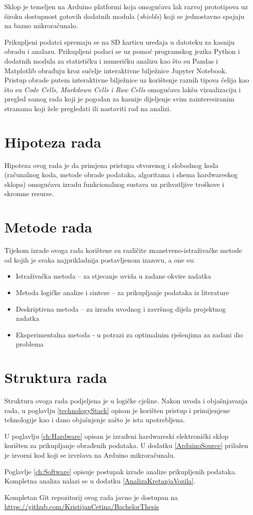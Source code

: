 Sklop je temeljen na Arduino platformi koja omogućava lak razvoj prototipova uz široku dostupnost gotovih dodatnih modula (\textit{shields}) koji se jednostavno spajaju na bazno mikroračunalo.

Prikupljeni podatci spremaju se na SD karticu uređaja u datoteku za kasniju obradu i analazu.
Prikupljeni podaci se uz pomoć programskog jezika Python i dodatnih modula za statističku i numeričku analizu kao što su Pandas i Matplotlib obrađuju kroz sučelje interaktivne bilježnice Jupyter Notebook.
Pristup obrade putem interaktivne bilježnice uz korištenje raznih tipova čelija kao što su \textit{Code Cells, Markdown Cells i Raw Cells} omogućava lakšu vizualizaciju i pregled samog rada koji je pogodan za kasnije dijeljenje svim zainteresiranim stranama koji žele pregledati ili nastaviti rad na analizi.

\section{Hipoteza rada}
Hipoteza ovog rada je da primjena pristupa otvorenog i slobodnog koda (računalnog koda, metode obrade podataka, algoritama i shema hardwareskog sklopa) omogućava izradu funkcionalnog sustava uz prihvatljive troškove i skromne resurse.

\section{Metode rada}
Tijekom izrade ovoga rada korištene su različite znanstveno-istraživačke metode od kojih je svaka najprikladnija postavljenom izazovu, a one su:
\begin{itemize}
\item Istraživačka metoda – za stjecanje uvida u zadane okvire zadatka
\item Metoda logičke analize i sinteze – za prikupljanje podataka iz literature
\item Deskriptivna metoda – za izradu uvodnog i završnog dijela projektnog zadatka
\item Eksperimentalna metoda - u potrazi za optimalnim rješenjima za zadani dio problema
\end{itemize}

\section{Struktura rada}
Struktura ovoga rada podjeljena je u logičke cjeline.
Nakon uvoda i objašnjavanja rada, u poglavlju \ref{technologyStack} opisan je korišten pristup i primijenjene tehnologije kao i dano objašnjenje zašto je ista upotrebljena.

U poglavlju \ref{ch:Hardware} opisan je izrađeni hardwareski elektronički sklop korišten za prikupljanje obrađenih podataka.
U dodatku \ref{ArduinoSource} priložen je izvorni kod koji se izvršava na Arduino mikroračunalu.

Poglavlje \ref{ch:Software} opisuje postupak izrade analize prikupljenih podataka.
Kompletna analiza nalazi se u dodatku \ref{AnalizaKretanjaVozila}.

Kompletan Git repozitorij ovog rada javno je dostupan na \url{https://github.com/KristijanCetina/BachelorThesis}
